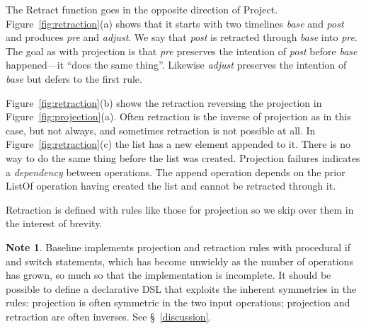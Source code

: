 \documentclass[english,submission]{programming}
\theoremstyle{definition}
\newtheorem*{note}{Note}
\begin{document}
The \textsf{Retract} function goes in the opposite direction of \textsf{Project}. Figure~\ref{fig:retraction}(a) shows that it starts with two timelines \textit{base} and \textit{post} and produces \textit{pre} and \textit{adjust}. We say that \textit{post} is retracted through \textit{base} into \textit{pre}. The goal as with projection is that \textit{pre} preserves the intention of \textit{post} before \textit{base} happened---it ``does the same thing''. Likewise \textit{adjust} preserves the intention of \textit{base} but defers to the first rule.

Figure~\ref{fig:retraction}(b) shows the retraction reversing the projection in Figure~\ref{fig:projection}(a). Often retraction is the inverse of projection as in this case, but not always, and sometimes retraction is not possible at all. In Figure~\ref{fig:retraction}(c) the list has a new element appended to it. There is no way to do the same thing before the list was created. Projection failures indicates a \textit{dependency} between operations. The \textsf{append} operation depends on the prior \textsf{ListOf} operation having created the list and cannot be retracted through it.

Retraction is defined with rules like those for projection so we skip over them in the interest of brevity.
\begin{note}
  Baseline implements projection and retraction rules with procedural if and switch statements, which has become unwieldy as the number of operations has grown, so much so that the implementation is incomplete. It should be possible to define a declarative DSL that exploits the inherent symmetries in the rules: projection is often symmetric in the two input operations; projection and retraction are often inverses. See \S~\ref{discussion}.
\end{note}
\end{document}
